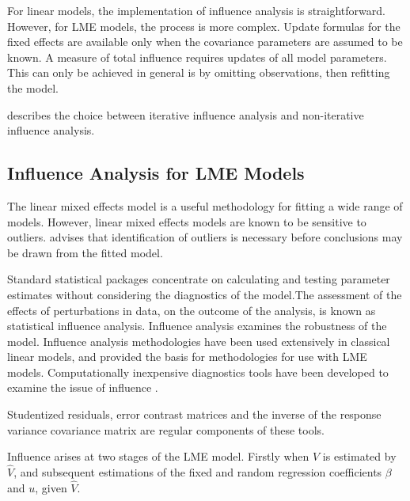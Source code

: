 \documentclass[Main.tex]{subfiles}
\begin{document}
		For linear models, the implementation of influence analysis is straightforward.
		However, for LME models, the process is more complex. Update formulas for the fixed effects are available only when the covariance parameters are assumed to be known. A measure of total influence requires updates of all model parameters.
		This can only be achieved in general is by omitting observations, then refitting the model.
		
		\citet{schabenberger} describes the choice between  iterative influence analysis and  non-iterative influence analysis.
		

		
		\subsection{Influence Analysis for LME Models} %
		The linear mixed effects model is a useful methodology for fitting a wide range of models. However, linear mixed effects models are known to be sensitive to outliers. \citet{CPJ} advises that identification of outliers is necessary before conclusions may be drawn from the fitted model.
		
		Standard statistical packages concentrate on calculating and testing parameter estimates without considering the diagnostics of the model.The assessment of the effects of perturbations in data, on the outcome of the analysis, is known as statistical influence analysis. Influence analysis examines the robustness of the model. Influence analysis methodologies have been used extensively in classical linear models, and provided the basis for methodologies for use with LME models.
		Computationally inexpensive diagnostics tools have been developed to examine the issue of influence \citep{Zewotir}.
		
		Studentized residuals, error contrast matrices and the inverse of the response variance covariance matrix are regular components of these tools.
		
			Influence arises at two stages of the LME model. Firstly when $V$ is estimated by $\hat{V}$, and subsequent
			estimations of the fixed and random regression coefficients $\beta$ and $u$, given $\hat{V}$.
\end{document}
